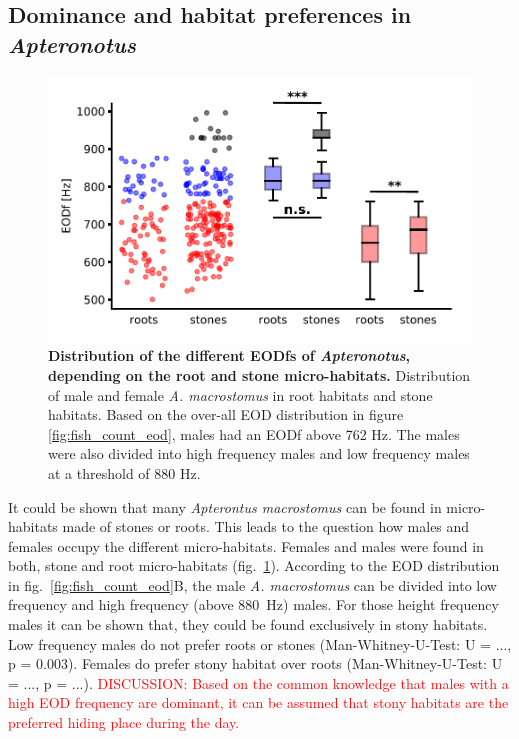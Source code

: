 
\subsection{Dominance and habitat preferences in \textit{Apteronotus}}

\begin{figure}[H]
    \centering
    \includegraphics{pictures/Results/eod_habitat.pdf}
    \caption{\textbf{Distribution of the different EODfs of \textit{Apteronotus}, depending on the root and stone micro-habitats.} Distribution of male and female \textit{A. macrostomus} in root habitats and stone habitats. Based on the over-all EOD distribution in figure \ref{fig:fish_count_eod}, males had an EODf above 762 Hz. The males were also divided into high frequency males and low frequency males at a threshold of 880 Hz.}
    \label{fig:habitat_vs_eod}
\end{figure}

It could be shown that many \textit{Apterontus macrostomus} can be found in micro-habitats made of stones or roots. This leads to the question how males and females occupy the different micro-habitats. Females and males were found in both, stone and root micro-habitats (fig.~\ref{fig:habitat_vs_eod}). According to the EOD distribution in fig.~\ref{fig:fish_count_eod}B, the male \textit{A. macrostomus} can be divided into low frequency and high frequency (above 880~Hz) males. For those height frequency males it can be shown that, they could be found exclusively in stony habitats. Low frequency males do not prefer roots or stones (Man-Whitney-U-Test: U = ..., p = 0.003).
Females do prefer stony habitat over roots (Man-Whitney-U-Test: U = ..., p = ...). \textcolor{red}{DISCUSSION: Based on the common knowledge that males with a high EOD frequency are dominant, it can be assumed that stony habitats are the preferred hiding place during the day.}